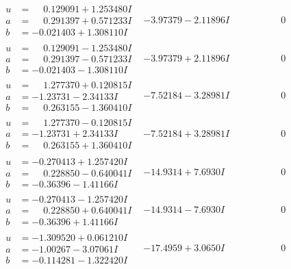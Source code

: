 \documentclass[1p]{elsarticle_modified}
\theoremstyle{definition}
\begin{document}
$$\begin{array}{c|c|c}
\begin{aligned}
u &= \phantom{-}0.129091 + 1.253480 I \\
a &= \phantom{-}0.291397 + 0.571233 I \\
b &= -0.021403 + 1.308110 I\end{aligned}
 & -3.97379 - 2.11896 I & \phantom{-0.000000 } 0 \\ \hline\begin{aligned}
u &= \phantom{-}0.129091 - 1.253480 I \\
a &= \phantom{-}0.291397 - 0.571233 I \\
b &= -0.021403 - 1.308110 I\end{aligned}
 & -3.97379 + 2.11896 I & \phantom{-0.000000 } 0 \\ \hline\begin{aligned}
u &= \phantom{-}1.277370 + 0.120815 I \\
a &= -1.23731 - 2.34133 I \\
b &= \phantom{-}0.263155 - 1.360410 I\end{aligned}
 & -7.52184 - 3.28981 I & \phantom{-0.000000 } 0 \\ \hline\begin{aligned}
u &= \phantom{-}1.277370 - 0.120815 I \\
a &= -1.23731 + 2.34133 I \\
b &= \phantom{-}0.263155 + 1.360410 I\end{aligned}
 & -7.52184 + 3.28981 I & \phantom{-0.000000 } 0 \\ \hline\begin{aligned}
u &= -0.270413 + 1.257420 I \\
a &= \phantom{-}0.228850 - 0.640041 I \\
b &= -0.36396 - 1.41166 I\end{aligned}
 & -14.9314 + 7.6930 I & \phantom{-0.000000 } 0 \\ \hline\begin{aligned}
u &= -0.270413 - 1.257420 I \\
a &= \phantom{-}0.228850 + 0.640041 I \\
b &= -0.36396 + 1.41166 I\end{aligned}
 & -14.9314 - 7.6930 I & \phantom{-0.000000 } 0 \\ \hline\begin{aligned}
u &= -1.309520 + 0.061210 I \\
a &= -1.00267 - 3.07061 I \\
b &= -0.114281 - 1.322420 I\end{aligned}
 & -17.4959 + 3.0650 I & \phantom{-0.000000 } 0 \\ \hline\begin{aligned}

\end{aligned}
\end{array}$$
\end{document}
